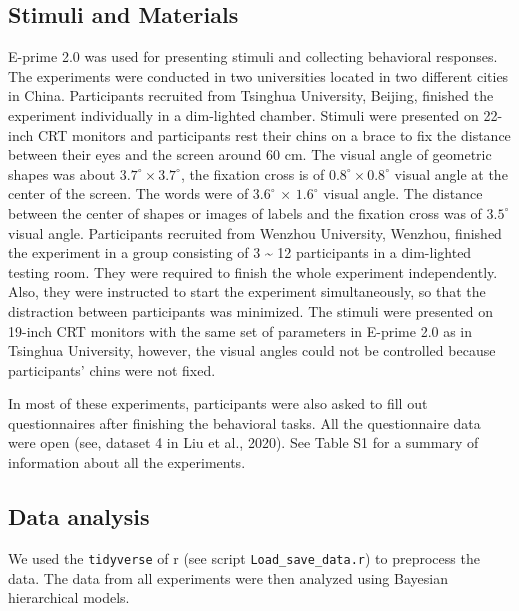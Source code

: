 \documentclass[
  man]{apa6}
\begin{document}
\hypertarget{stimuli-and-materials}{%
\subsection{Stimuli and Materials}\label{stimuli-and-materials}}

E-prime 2.0 was used for presenting stimuli and collecting behavioral responses. The experiments were conducted in two universities located in two different cities in China. Participants recruited from Tsinghua University, Beijing, finished the experiment individually in a dim-lighted chamber. Stimuli were presented on 22-inch CRT monitors and participants rest their chins on a brace to fix the distance between their eyes and the screen around 60 cm. The visual angle of geometric shapes was about \(3.7^\circ × 3.7^\circ\), the fixation cross is of \(0.8^\circ × 0.8^\circ\) visual angle at the center of the screen. The words were of \(3.6^\circ\) × \(1.6^\circ\) visual angle. The distance between the center of shapes or images of labels and the fixation cross was of \(3.5^\circ\) visual angle. Participants recruited from Wenzhou University, Wenzhou, finished the experiment in a group consisting of 3 \textasciitilde{} 12 participants in a dim-lighted testing room. They were required to finish the whole experiment independently. Also, they were instructed to start the experiment simultaneously, so that the distraction between participants was minimized. The stimuli were presented on 19-inch CRT monitors with the same set of parameters in E-prime 2.0 as in Tsinghua University, however, the visual angles could not be controlled because participants' chins were not fixed.

In most of these experiments, participants were also asked to fill out questionnaires after finishing the behavioral tasks. All the questionnaire data were open (see, dataset 4 in Liu et al., 2020). See Table S1 for a summary of information about all the experiments.

\hypertarget{data-analysis}{%
\subsection{Data analysis}\label{data-analysis}}

We used the \texttt{tidyverse} of r (see script \texttt{Load\_save\_data.r}) to preprocess the data. The data from all experiments were then analyzed using Bayesian hierarchical models.
\end{document}

